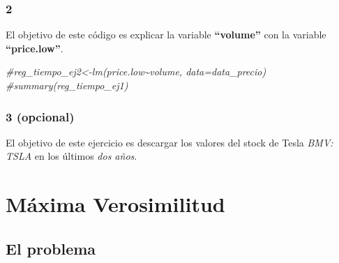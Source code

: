 \documentclass[
]{book}
\newenvironment{Shaded}{\begin{snugshade}}{\end{snugshade}}
\newcommand{\CommentTok}[1]{\textcolor[rgb]{0.56,0.35,0.01}{\textit{#1}}}
\begin{document}
\hypertarget{section-1}{%
\subsection{2}\label{section-1}}

El objetivo de este código es explicar la variable \textbf{``volume''} con la variable \textbf{``price.low''}.

\begin{Shaded}
\begin{Highlighting}[]
\CommentTok{\#reg\_tiempo\_ej2\textless{}{-}lm(price.low\textasciitilde{}volume, data=data\_precio)}
\CommentTok{\#summary(reg\_tiempo\_ej1)}
\end{Highlighting}
\end{Shaded}

\hypertarget{opcional}{%
\subsection{3 (opcional)}\label{opcional}}

El objetivo de este ejercicio es descargar los valores del stock de Tesla \emph{BMV: TSLA} en los últimos \emph{dos años}.

\begin{Shaded}
\end{Shaded}

\hypertarget{muxe1xima-verosimilitud}{%
\chapter{Máxima Verosimilitud}\label{muxe1xima-verosimilitud}}

\hypertarget{el-problema-1}{%
\section{El problema}\label{el-problema-1}}
\end{document}
